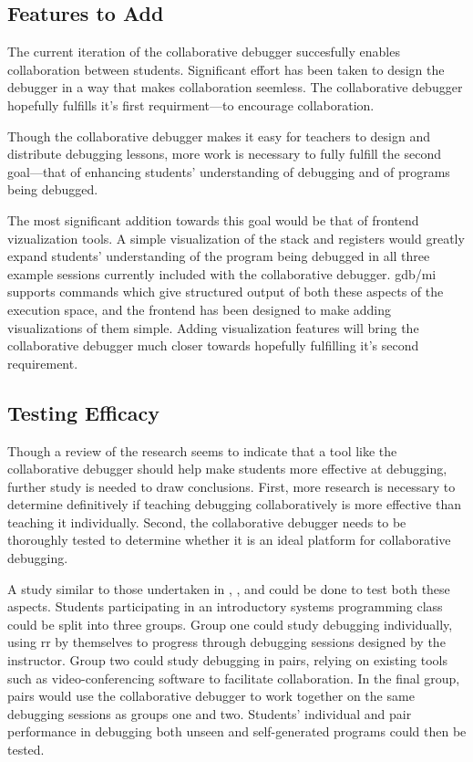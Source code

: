 \documentclass[12pt]{article}
\begin{document}
\subsection{Features to Add}

The current iteration of the collaborative debugger succesfully
enables collaboration between students.  Significant effort has been
taken to design the debugger in a way that makes collaboration
seemless.  The collaborative debugger hopefully fulfills it's first
requirment---to encourage collaboration.
\par

Though the collaborative debugger makes it easy for teachers to design
and distribute debugging lessons, more work is necessary to fully
fulfill the second goal---that of enhancing students' understanding of
debugging and of programs being debugged.
\par

The most significant addition towards this goal would be that of
frontend vizualization tools.  A simple visualization of the stack and
registers would greatly expand students' understanding of the program
being debugged in all three example sessions currently included with
the collaborative debugger.  gdb/mi supports commands which give
structured output of both these aspects of the execution space, and
the frontend has been designed to make adding visualizations of them
simple.  Adding visualization features will bring the collaborative
debugger much closer towards hopefully fulfilling it's second
requirement.

\subsection{Testing Efficacy}

Though a review of the research seems to indicate that a tool like the
collaborative debugger should help make students more effective at
debugging, further study is needed to draw conclusions.  First, more
research is necessary to determine definitively if teaching debugging
collaboratively is more effective than teaching it individually.
Second, the collaborative debugger needs to be thoroughly tested to
determine whether it is an ideal platform for collaborative debugging.
\par

A study similar to those undertaken in \cite{10.1145/1026487.1008043},
\cite{10.1145/1145287.1145293}, and \cite{10.1145/3361721.3361724}
could be done to test both these aspects.  Students participating in
an introductory systems programming class could be split into three
groups.  Group one could study debugging individually, using rr by
themselves to progress through debugging sessions designed by the
instructor.  Group two could study debugging in pairs, relying on
existing tools such as video-conferencing software to facilitate
collaboration.  In the final group, pairs would use the collaborative
debugger to work together on the same debugging sessions as groups one
and two.  Students' individual and pair performance in debugging both
unseen and self-generated programs could then be tested.
\end{document}
